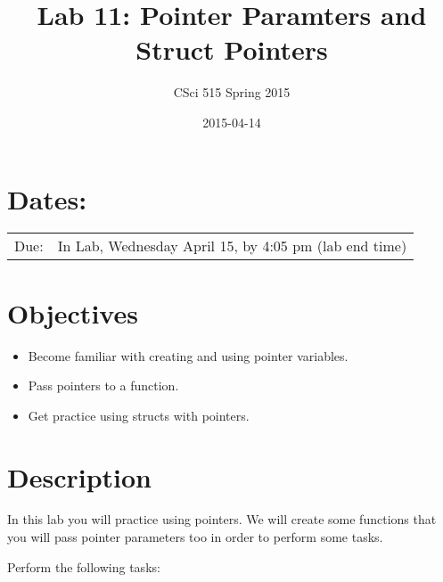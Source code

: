 \documentclass[11pt]{article}
\title{Lab 11: Pointer Paramters and Struct Pointers}
\author{CSci 515 Spring 2015}
\date{2015-04-14}
\begin{document}
\maketitle


\section*{Dates:}
\label{sec-1}


\begin{center}
\begin{tabular}{ll}
 Due:  &  In Lab, Wednesday April 15, by 4:05 pm (lab end time)  \\
\end{tabular}
\end{center}
\section*{Objectives}
\label{sec-2}

\begin{itemize}
\item Become familiar with creating and using pointer variables.
\item Pass pointers to a function.
\item Get practice using structs with pointers.
\end{itemize}
\section*{Description}
\label{sec-3}

In this lab you will practice using pointers.  We will create
some functions that you will pass pointer parameters too
in order to perform some tasks.

Perform the following tasks:
\end{document}
